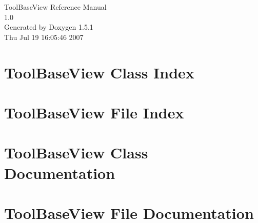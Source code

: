 \documentclass[a4paper]{book}
\begin{document}
\begin{titlepage}
\vspace*{7cm}
\begin{center}
{\Large Tool\-Base\-View Reference Manual\\[1ex]\large 1.0 }\\
\vspace*{1cm}
{\large Generated by Doxygen 1.5.1}\\
\vspace*{0.5cm}
{\small Thu Jul 19 16:05:46 2007}\\
\end{center}
\end{titlepage}
\clearemptydoublepage
{}
\tableofcontents
\clearemptydoublepage
{}
\chapter{Tool\-Base\-View Class Index}

\chapter{Tool\-Base\-View File Index}

\chapter{Tool\-Base\-View Class Documentation}





\chapter{Tool\-Base\-View File Documentation}







\printindex
\end{document}
